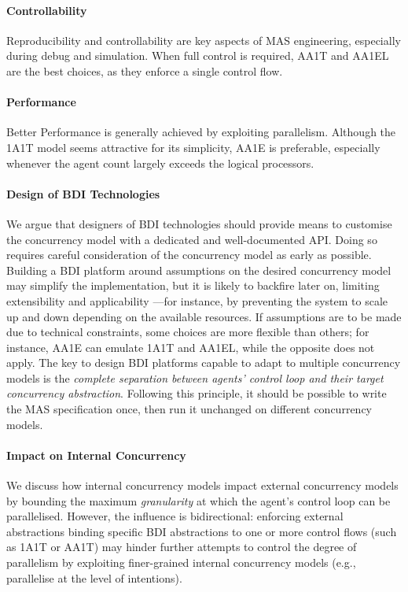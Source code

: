 \paragraph{Controllability}

Reproducibility and controllability are key aspects of \ac{MAS} engineering,
especially during debug and simulation.
%
When full control is required,
\ac{AA1T} and \ac{AA1EL} are the best choices,
as they enforce a single control flow.

\paragraph{Performance}

Better Performance is generally achieved by exploiting parallelism.
%
Although the \ac{1A1T} model seems attractive for its simplicity,
\ac{AA1E} is preferable,
especially whenever the agent count largely exceeds the logical processors.

\paragraph{Design of \ac{BDI} Technologies}

We argue that designers of \ac{BDI} technologies should provide means to customise the concurrency model
with a dedicated and well-documented \ac{API}.
%
Doing so requires careful consideration of the concurrency model as early as possible.
%
Building a \ac{BDI} platform around assumptions on the desired concurrency model may simplify the implementation,
but it is likely to backfire later on,
limiting extensibility and applicability%
---for instance, by preventing the system to scale up and down depending on the available resources.
%
If assumptions are to be made due to technical constraints,
some choices are more flexible than others;
for instance, \ac{AA1E} can emulate \ac{1A1T} and \ac{AA1EL},
while the opposite does not apply.
%
The key to design \ac{BDI} platforms capable to adapt to multiple concurrency models is the
\emph{complete separation between agents' control loop and their target concurrency abstraction}.
%
Following this principle,
it should be possible to write the \ac{MAS} specification once,
then run it unchanged on different concurrency models.
%
\paragraph{Impact on Internal Concurrency}

We discuss how internal concurrency models impact external concurrency models
by bounding the maximum \emph{granularity} at which the agent's control loop can be parallelised.
%
However, the influence is bidirectional:
enforcing external abstractions binding specific \ac{BDI} abstractions to one or more control flows
(such as \ac{1A1T} or \ac{AA1T}) may hinder further attempts to control the degree of parallelism
by exploiting finer-grained internal concurrency models
(e.g., parallelise at the level of intentions).


